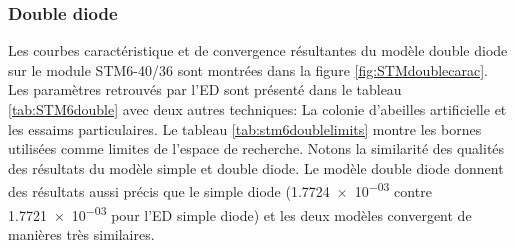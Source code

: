 \subsubsection{Double diode}
Les courbes caractéristique et de convergence résultantes du modèle double diode sur le module STM6-40/36 sont montrées dans la figure \ref{fig:STMdoublecarac}. Les paramètres retrouvés par l'ED sont présenté dans le tableau \ref{tab:STM6double} avec deux autres techniques: La colonie d'abeilles artificielle et les essaims particulaires. Le tableau \ref{tab:stm6doublelimits} montre les bornes utilisées comme limites de l'espace de recherche. Notons la similarité des qualités des résultats du modèle simple et double diode. Le modèle double diode donnent des résultats aussi précis que le simple diode (\num{1.7724e-03} contre \num{1.7721e-03} pour l'ED simple diode) et les deux modèles convergent de manières très similaires.
